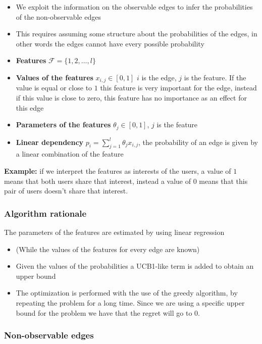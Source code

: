 \documentclass[10pt,a4paper]{article}
\begin{document}
\begin{itemize}

\item We exploit the information on the observable edges to infer the probabilities of the non-observable edges
\item This requires assuming some structure about the probabilities of the edges, in other words the edges cannot have every possible probability
\item \textbf{Features} $\mathscr{F} = \{1,2,\ldots,l\}$
\item \textbf{Values of the features} $x_{i,j} \in [0,1]$ $i$ is the edge, $j$ is the feature. If the value is equal or close to $1$  this feature is very important for the edge, instead if this value is close to zero, this feature has no importance as an effect for this edge
\item \textbf{Parameters of the features} $\theta_j \in [0,1]$, $j$ is the feature
\item \textbf{Linear dependency} $p_i = \sum_{j=1}^{l}{\theta_j x_{i,j}}$, the probability of an edge is given by a linear combination of the feature
\end{itemize}

\textbf{Example:} if we interpret the features as interests of the users, a value of $1$ means that both users share that interest, instead a value of $0$ means that this pair of users doesn't share that interest.

\subsubsection{Algorithm rationale}\label{algorithm-rationale}

The parameters of the features are estimated by using linear regression

\begin{itemize}
\item (While the values of the features for every edge are known)
\item Given the values of the probabilities a UCB1-like term is added to obtain an upper bound
\item The optimization is performed with the use of the greedy algorithm, by repeating the problem for a long time. Since we are using a specific  upper bound for the problem we have that the regret will go to $0$.
\end{itemize}

\subsubsection{Non-observable edges}\label{non-observable-edges}
\end{document}
